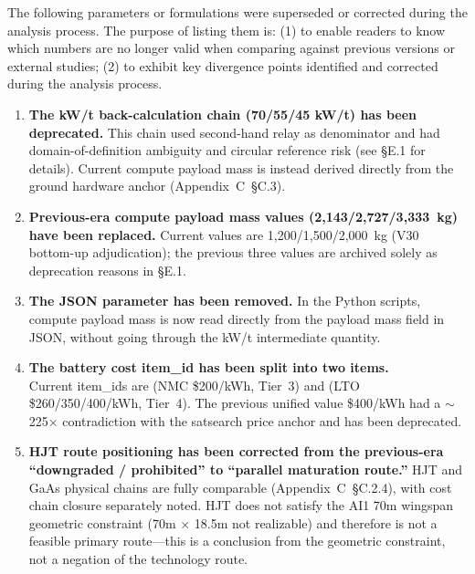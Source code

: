 The following parameters or formulations were superseded or corrected during the analysis process. The purpose of listing them is: (1) to enable readers to know which numbers are no longer valid when comparing against previous versions or external studies; (2) to exhibit key divergence points identified and corrected during the analysis process.

\begin{enumerate}
  \item \textbf{The kW/t back-calculation chain (70/55/45 kW/t) has been deprecated.} This chain used second-hand relay as denominator and had domain-of-definition ambiguity and circular reference risk (see \S E.1 for details). Current compute payload mass is instead derived directly from the ground hardware anchor (Appendix~C~\S C.3).

  \item \textbf{Previous-era compute payload mass values (2,143/2,727/3,333~kg) have been replaced.} Current values are 1,200/1,500/2,000~kg (V30 bottom-up adjudication); the previous three values are archived solely as deprecation reasons in \S E.1.

  \item \textbf{The JSON parameter  has been removed.} In the Python scripts, compute payload mass is now read directly from the payload mass field in JSON, without going through the kW/t intermediate quantity.

  \item \textbf{The battery cost item\_id  has been split into two items.}\\
        Current item\_ids are  (NMC \$200/kWh, Tier~3) and  (LTO \$260/350/400/kWh, Tier~4). The previous unified value \$400/kWh had a $\sim$225$\times$ contradiction with the satsearch price anchor and has been deprecated.

  \item \textbf{HJT route positioning has been corrected from the previous-era ``downgraded / prohibited'' to ``parallel maturation route.''} HJT and GaAs physical chains are fully comparable (Appendix~C~\S C.2.4), with cost chain closure separately noted. HJT does not satisfy the AI1 70m wingspan geometric constraint (70m $\times$ 18.5m not realizable) and therefore is not a feasible primary route---this is a conclusion from the geometric constraint, not a negation of the technology route.


\end{enumerate}
